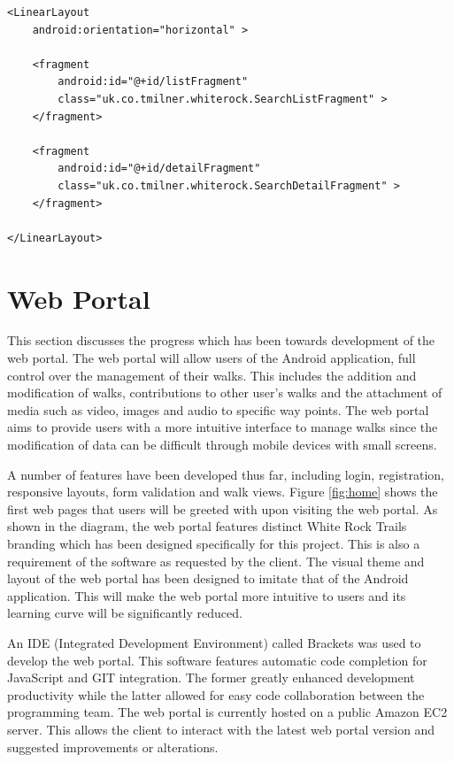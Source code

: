 \documentclass[11pt,a4paper]{article}
\begin{document}
\begin{lstlisting}[captionpos=b, caption=Fragment Code Snippet, label=lst:Fragment Code Snippet, frame=single]
<LinearLayout 
    android:orientation="horizontal" >
 
    <fragment
        android:id="@+id/listFragment"
        class="uk.co.tmilner.whiterock.SearchListFragment" >
    </fragment>

    <fragment
        android:id="@+id/detailFragment"
        class="uk.co.tmilner.whiterock.SearchDetailFragment" >
    </fragment>
    
</LinearLayout>
\end{lstlisting}


\section{Web Portal}
\label{sec:web-portal}

This section discusses the progress which has been towards development of the web portal. The web portal will allow users of the Android application, full control over the management of their walks. This includes the addition and modification of walks, contributions to other user's walks and the attachment of media such as video, images and audio to specific way points. The web portal aims to provide users with a more intuitive interface to manage walks since the modification of data can be difficult through mobile devices with small screens.

A number of features have been developed thus far, including login, registration, responsive layouts, form validation and walk views. Figure \ref{fig:home} shows the first web pages that users will be greeted with upon visiting the web portal. As shown in the diagram, the web portal features distinct White Rock Trails branding which has been designed specifically for this project. This is also a requirement of the software as requested by the client. The visual theme and layout of the web portal has been designed to imitate that of the Android application. This will make the web portal more intuitive to users and its learning curve will be significantly reduced.

An IDE (Integrated Development Environment) called Brackets was used to develop the web portal. This software features automatic code completion for JavaScript and GIT integration. The former greatly enhanced development productivity while the latter allowed for easy code collaboration between the programming team. The web portal is currently hosted on a public Amazon EC2 server. This allows the client to interact with the latest web portal version and suggested improvements or alterations.
\end{document}

